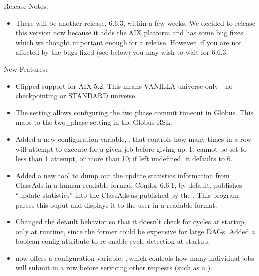 \noindent Release Notes:

\begin{itemize}

\item There will be another release, 6.6.3, within a few weeks.  We decided to
	release this version now because it adds the AIX platform and has some bug
	fixes which we thought important enough for a release.  However, if you are
	not affected by the bugs fixed (see below) you may wish to wait for 6.6.3.
     

\end{itemize}


\noindent New Features:

\begin{itemize}

\item Clipped support for AIX 5.2.
      This means VANILLA universe only - no checkpointing or STANDARD universe.

\item The setting  allows
   configuring the two phase commit timeout in Globus.  This maps to the
   two\_phase setting in the Globus RSL.

\item Added a new configuration variable,
      , that controls how many
      times in a row  will attempt to execute
       for a given job before giving up.  It cannot be
      set to less than 1 attempt, or more than 10; if left undefined,
      it defaults to 6.

\item Added a new tool  to dump out the update
statistics information from ClassAds in a human readable format.
Condor 6.6.1, by default, publishes ``update statistics'' into the
ClassAds as published by the .  This program parses
this ouput and displays it to the user in a readable format.

\item Changed the default  behavior so that it doesn't
      check for cycles at startup, only at runtime, since the former
      could be expensive for large DAGs.  Added a boolean
       config attribute to
      re-enable cycle-detection at startup.

\item {} now offers a configuration variable,
      , which controls how
      many individual jobs  will submit in a row before
      servicing other requests (such as a ).


\end{itemize}
